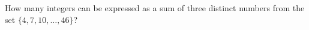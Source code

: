 How many integers can be expressed as a sum of three distinct numbers from the set $\{4,7,10,\dots,46\}$?
